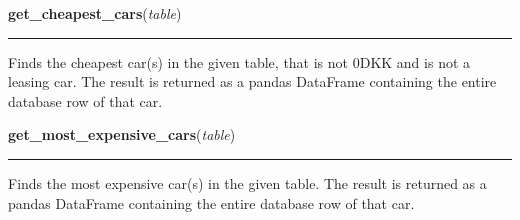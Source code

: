     \label{BilbasenDataMining:datamining:get_cheapest_cars}

    \vspace{0.5ex}

\hspace{.8\funcindent}\begin{boxedminipage}{\funcwidth}

    \raggedright \textbf{get\_cheapest\_cars}(\textit{table})

    \vspace{-1.5ex}

    \rule{\textwidth}{0.5\fboxrule}
\setlength{\parskip}{2ex}
    Finds the cheapest car(s) in the given table, that is not 0DKK and is 
    not a leasing car. The result is returned as a pandas DataFrame 
    containing the entire database row of that car.

\setlength{\parskip}{1ex}
    \end{boxedminipage}

    \label{BilbasenDataMining:datamining:get_most_expensive_cars}

    \vspace{0.5ex}

\hspace{.8\funcindent}\begin{boxedminipage}{\funcwidth}

    \raggedright \textbf{get\_most\_expensive\_cars}(\textit{table})

    \vspace{-1.5ex}

    \rule{\textwidth}{0.5\fboxrule}
\setlength{\parskip}{2ex}
    Finds the most expensive car(s) in the given table. The result is 
    returned as a pandas DataFrame containing the entire database row of 
    that car.

\setlength{\parskip}{1ex}
    \end{boxedminipage}

    \label{BilbasenDataMining:datamining:get_most_ecofriendly_cars}

